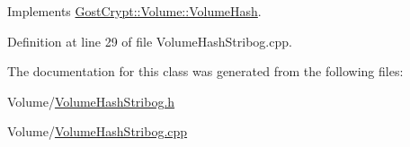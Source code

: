 Implements \hyperlink{class_gost_crypt_1_1_volume_1_1_volume_hash_a58c69a4ea5a247454bd6b4dd6c736ecd}{Gost\+Crypt\+::\+Volume\+::\+Volume\+Hash}.



Definition at line 29 of file Volume\+Hash\+Stribog.\+cpp.



The documentation for this class was generated from the following files\+:\begin{DoxyCompactItemize}
\item 
Volume/\hyperlink{_volume_hash_stribog_8h}{Volume\+Hash\+Stribog.\+h}\item 
Volume/\hyperlink{_volume_hash_stribog_8cpp}{Volume\+Hash\+Stribog.\+cpp}\end{DoxyCompactItemize}
